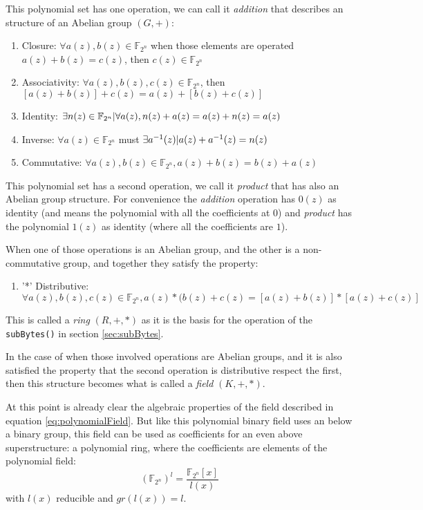 \documentclass[10pt,a4paper,twoside]{llncs}
\newcommand{\Fpn}[2]{\ensuremath{\mathbb{F}_{#1^#2}}}
\begin{document}
This polynomial set has one operation, we can call it \emph{addition} that describes an structure of an Abelian group $(G,+)$:
\begin{enumerate}
 \item Closure: $\forall a(z),b(z) \in \Fpn{2}{n}$ when those elements are operated $a(z)+b(z)=c(z)$, then $c(z) \in \Fpn{2}{n}$
 \item Associativity: $\forall a(z),b(z),c(z) \in \Fpn{2}{n}$, then $[a(z)+b(z)]+c(z)=a(z)+[b(z)+c(z)]$
 \item Identity: $\exists n(z) \in \Fpn{2}{n} \arrowvert \forall a(z), n(z)+a(z)=a(z)+n(z)=a(z)$
 \item Inverse: $\forall a(z) \in \Fpn{2}{n}$ must $\exists a^{-1}(z) \arrowvert a(z)+a^{-1}(z) = n(z)$
 \item Commutative: $\forall a(z),b(z) \in \Fpn{2}{n}, a(z)+b(z)=b(z)+a(z)$
\end{enumerate}

This polynomial set has a second operation, we call it \emph{product} that has also an Abelian group structure. For convenience the \emph{addition} operation has $0(z)$ as identity (and means the polynomial with all the coefficients at $0$) and \emph{product} has the polynomial $1(z)$ as identity (where all the coefficients are $1$).

When one of those operations is an Abelian group, and the other is a non-commutative group, and together they satisfy the property:
\begin{enumerate}
 \item '*' Distributive: $\forall a(z),b(z),c(z) \in \Fpn{2}{n}, a(z)*(b(z)+c(z)=[a(z)+b(z)]*[a(z)+c(z)]$
\end{enumerate}
This is called a \emph{ring} $(R,+,*)$ as it is the basis for the operation of the {\tt subBytes()} in section \ref{sec:subBytes}.

In the case of when those involved operations are Abelian groups, and it is also satisfied the property that the second operation is distributive respect the first, then this structure becomes what is called a \emph{field} $(K,+,*)$.

At this point is already clear the algebraic properties of the field described in equation \ref{eq:polynomialField}. But like this polynomial binary field uses an below a binary group, this field can be used as coefficients for an even above superstructure: a polynomial ring, where the coefficients are elements of the polynomial field:
\begin{equation}\label{eq:polynomialRing}
    (\Fpn{2}{n})^l=\frac{\Fpn{2}{n}[x]}{l(x)}
\end{equation}
with $l(x)$ reducible and $gr(l(x))=l$.
\end{document}
